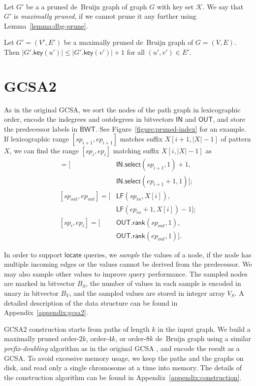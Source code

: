 \documentclass[twoside,leqno,twocolumn]{article}
\newcommand{\abs}[1]{\ensuremath{\lvert #1 \rvert}}
\newcommand{\rank}{\ensuremath{\mathsf{rank}}}
\newcommand{\select}{\ensuremath{\mathsf{select}}}
\newcommand{\LF}{\ensuremath{\mathsf{LF}}}
\newcommand{\locate}{\ensuremath{\mathsf{locate}}}
\newcommand{\gkey}{\ensuremath{\mathsf{key}}}
\newcommand{\orderk}[1]{order\nobreakdash-$#1$}
\newcommand{\BWT}{\ensuremath{\mathsf{BWT}}}
\newcommand{\bvIN}{\ensuremath{\mathsf{IN}}}
\newcommand{\bvOUT}{\ensuremath{\mathsf{OUT}}}
\begin{document}
\begin{Definition} ~\\
Let $G'$ be a a pruned de~Bruijn graph of graph $G$ with key set $\mathcal{K}$. We say that $G'$ is \emph{maximally pruned}, if we cannot prune it any further using Lemma~\ref{lemma:dbg-prune}.
\end{Definition}

\begin{lemma}\label{lemma:dbg-maximal}
Let $G' = (V', E')$ be a maximally pruned de~Bruijn graph of $G = (V, E)$. Then $\abs{G'.\gkey(u')} \le \abs{G'.\gkey(v')}+1$ for all $(u', v') \in E'$.
\end{lemma}


\section{GCSA2}

As in the original GCSA, we sort the nodes of the path graph in lexicographic order, encode the indegrees and outdegrees in bitvectors $\bvIN$ and $\bvOUT$, and store the predecessor labels in $\BWT$. See Figure~\ref{figure:pruned-index} for an example. If lexicographic range $[sp_{i+1}, ep_{i+1}]$ matches suffix $X[i+1, \abs{X}-1]$ of pattern $X$, we can find the range $[sp_{i}, ep_{i}]$ matching suffix $X[i, \abs{X}-1]$ as
\begin{align*}
[sp_{in}, ep_{in}] = [&\bvIN.\select(sp_{i+1}, 1) + 1, \\
 & \bvIN.\select(ep_{i+1}+1, 1)]; \\
[sp_{out}, ep_{out}] = [&\LF(sp_{in}, X[i]), \\
 & \LF(ep_{in}+1, X[i]) - 1]; \\
[sp_{i}, ep_{i}] = [&\bvOUT.\rank(sp_{out}, 1), \\
 & \bvOUT.\rank(ep_{out}, 1)].
\end{align*}

In order to support $\locate$ queries, we \emph{sample} the values of a node, if the node has multiple incoming edges or the values cannot be derived from the predecessor. We may also sample other values to improve query performance. The sampled nodes are marked in bitvector $B_{S}$, the number of values in each sample is encoded in unary in bitvector $B_{V}$, and the sampled values are stored in integer array $V_{S}$. A detailed description of the data structure can be found in Appendix~\ref{appendix:gcsa2}.

GCSA2 construction starts from paths of length $k$ in the input graph. We build a maximally pruned \orderk{2k}, \orderk{4k}, or \orderk{8k} de~Bruijn graph using a similar \emph{prefix-doubling} algorithm as in the original GCSA \cite{Siren2014}, and encode the result as a GCSA. To avoid excessive memory usage, we keep the paths and the graphs on disk, and read only a single chromosome at a time into memory. The details of the construction algorithm can be found in Appendix~\ref{appendix:construction}.
\end{document}
